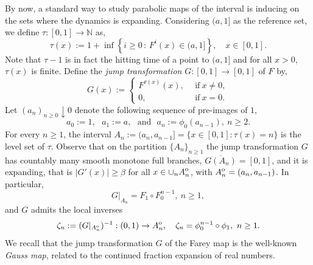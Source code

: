 \documentclass{amsart}
\theoremstyle{definition}
\theoremstyle{remark}
\theoremstyle{definition}
\numberwithin{equation}{section}
\newcommand{\set}[1]{\left\{#1\right\}}
\newcommand{\N}{\mathbb N}
\newcommand{\interior}[1]{{\kern0pt#1}^{\mathrm{o}}}
\begin{document}
By now, a standard way to study parabolic maps of the interval is inducing on the sets where the dynamics is expanding. Considering $(a,1]$ as the reference set, we define $\tau : [0,1] \rightarrow \N$ as,
\[
        \tau(x) := 1 + \inf \set{ i \ge 0 \, : \, F^{i}(x) \in (a,1]}, \quad x \in [0,1]. 
\]    
Note that $\tau -1$ is in fact the hitting time of a point to $(a,1]$ and for all $x > 0$, $\tau(x)$ is finite. Define the \emph{jump transformation} $G : [0,1] \to [0,1]$ of $F$ by,
\[
    G(x) := \begin{cases}
        F^{\tau(x)}(x), \ & \ \text{if} \ x \neq 0, \\
        0, \  & \ \text{if} \ x = 0.
    \end{cases}
\] 
Let $(a_{n})_{n \ge 0} \downarrow 0$ denote the following sequence of pre-images of $1$,
\begin{equation} \label{preimages}
        a_{0}:=1, \ \ \ a_{1}:= a, \ \ \ \text{and} \ \ \   a_{n}:=\phi_{0}(a_{n-1}), \  n \ge 2. 
\end{equation} 
For every $n\ge 1$, the interval $A_{n}:= (a_{n}, a_{n-1}] = \{ x \in [0,1] : \tau(x) = n \}$ is the level set of $\tau$. Observe that on the partition $\{ A_{n}\}_{n \ge 1}$ the jump transformation $G$ has countably many smooth monotone full branches, $\overline{G(A_n)}=[0,1]$, and it is expanding, that is $|G'(x)| \ge \beta$ for all $x\in \cup_n \interior{A}_n$, with $\interior{A}_n=(a_{n}, a_{n-1})$. In particular,
\begin{equation} \label{GAn}
G|_{A_n} = F_1 \circ F_0^{n-1}, \  n \ge 1, 
\end{equation}
and $G$ admits the local inverses 
\begin{equation} \label{GAn-inv}
\zeta_n := (G|_{\interior{A}_n})^{-1} : (0,1) \to \interior{A}_n, \quad \zeta_n = \phi_0^{n-1} \circ \phi_1, \  n \ge 1.
\end{equation}
We recall that the jump transformation $G$ of the Farey map is the well-known \emph{Gauss map}, related to the continued fraction expansion of real numbers.
\end{document}
